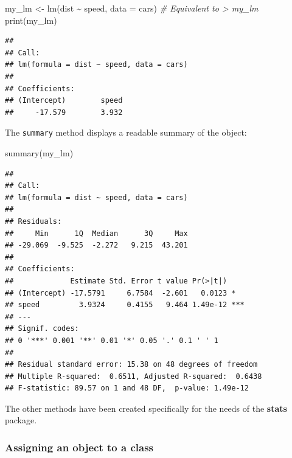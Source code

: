 \documentclass[
  12pt,
  american,
  a4paper,
  extrafontsizes,onecolumn,openright
  ]{memoir}
\newenvironment{Shaded}{\begin{snugshade}}{\end{snugshade}}
\newcommand{\AttributeTok}[1]{\textcolor[rgb]{0.77,0.63,0.00}{#1}}
\newcommand{\CommentTok}[1]{\textcolor[rgb]{0.56,0.35,0.01}{\textit{#1}}}
\newcommand{\FunctionTok}[1]{\textcolor[rgb]{0.00,0.00,0.00}{#1}}
\newcommand{\NormalTok}[1]{#1}
\newcommand{\OtherTok}[1]{\textcolor[rgb]{0.56,0.35,0.01}{#1}}
\newcommand{\SpecialCharTok}[1]{\textcolor[rgb]{0.00,0.00,0.00}{#1}}
\begin{document}
\begin{Shaded}
\begin{Highlighting}[]
\NormalTok{my\_lm }\OtherTok{\textless{}{-}} \FunctionTok{lm}\NormalTok{(dist }\SpecialCharTok{\textasciitilde{}}\NormalTok{ speed, }\AttributeTok{data =}\NormalTok{ cars)}
\CommentTok{\# Equivalent to \textquotesingle{}\textgreater{} my\_lm\textquotesingle{}}
\FunctionTok{print}\NormalTok{(my\_lm)}
\end{Highlighting}
\end{Shaded}

\begin{verbatim}
## 
## Call:
## lm(formula = dist ~ speed, data = cars)
## 
## Coefficients:
## (Intercept)        speed  
##     -17.579        3.932
\end{verbatim}

\normalsize

The \texttt{summary} method displays a readable summary of the object:

\scriptsize

\begin{Shaded}
\begin{Highlighting}[]
\FunctionTok{summary}\NormalTok{(my\_lm)}
\end{Highlighting}
\end{Shaded}

\begin{verbatim}
## 
## Call:
## lm(formula = dist ~ speed, data = cars)
## 
## Residuals:
##     Min      1Q  Median      3Q     Max 
## -29.069  -9.525  -2.272   9.215  43.201 
## 
## Coefficients:
##             Estimate Std. Error t value Pr(>|t|)    
## (Intercept) -17.5791     6.7584  -2.601   0.0123 *  
## speed         3.9324     0.4155   9.464 1.49e-12 ***
## ---
## Signif. codes:  
## 0 '***' 0.001 '**' 0.01 '*' 0.05 '.' 0.1 ' ' 1
## 
## Residual standard error: 15.38 on 48 degrees of freedom
## Multiple R-squared:  0.6511, Adjusted R-squared:  0.6438 
## F-statistic: 89.57 on 1 and 48 DF,  p-value: 1.49e-12
\end{verbatim}

\normalsize

The other methods have been created specifically for the needs of the \textbf{stats} package.

\hypertarget{assigning-an-object-to-a-class}{%
\subsubsection{Assigning an object to a class}\label{assigning-an-object-to-a-class}}
\end{document}
